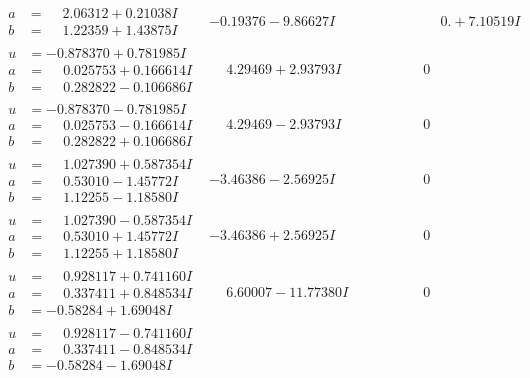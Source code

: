 \documentclass[1p]{elsarticle_modified}
\theoremstyle{definition}
\begin{document}
$$\begin{array}{c|c|c}
\begin{aligned}
a &= \phantom{-}2.06312 + 0.21038 I \\
b &= \phantom{-}1.22359 + 1.43875 I\end{aligned}
 & -0.19376 - 9.86627 I & \phantom{-0.000000 -}0. + 7.10519 I \\ \hline\begin{aligned}
u &= -0.878370 + 0.781985 I \\
a &= \phantom{-}0.025753 + 0.166614 I \\
b &= \phantom{-}0.282822 - 0.106686 I\end{aligned}
 & \phantom{-}4.29469 + 2.93793 I & \phantom{-0.000000 } 0 \\ \hline\begin{aligned}
u &= -0.878370 - 0.781985 I \\
a &= \phantom{-}0.025753 - 0.166614 I \\
b &= \phantom{-}0.282822 + 0.106686 I\end{aligned}
 & \phantom{-}4.29469 - 2.93793 I & \phantom{-0.000000 } 0 \\ \hline\begin{aligned}
u &= \phantom{-}1.027390 + 0.587354 I \\
a &= \phantom{-}0.53010 - 1.45772 I \\
b &= \phantom{-}1.12255 - 1.18580 I\end{aligned}
 & -3.46386 - 2.56925 I & \phantom{-0.000000 } 0 \\ \hline\begin{aligned}
u &= \phantom{-}1.027390 - 0.587354 I \\
a &= \phantom{-}0.53010 + 1.45772 I \\
b &= \phantom{-}1.12255 + 1.18580 I\end{aligned}
 & -3.46386 + 2.56925 I & \phantom{-0.000000 } 0 \\ \hline\begin{aligned}
u &= \phantom{-}0.928117 + 0.741160 I \\
a &= \phantom{-}0.337411 + 0.848534 I \\
b &= -0.58284 + 1.69048 I\end{aligned}
 & \phantom{-}6.60007 - 11.77380 I & \phantom{-0.000000 } 0 \\ \hline\begin{aligned}
u &= \phantom{-}0.928117 - 0.741160 I \\
a &= \phantom{-}0.337411 - 0.848534 I \\
b &= -0.58284 - 1.69048 I\end{aligned}

\end{array}$$
\end{document}
